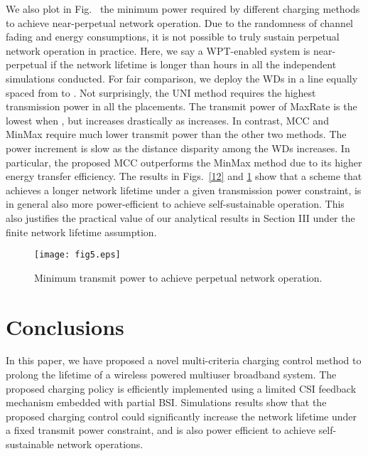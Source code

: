 \documentclass[conference]{IEEEtran}
\begin{document}
We also plot in Fig.~ the minimum power required by different charging methods to achieve near-perpetual network operation. Due to the randomness of channel fading and energy consumptions, it is not possible to truly sustain perpetual network operation in practice. Here, we say a WPT-enabled system is near-perpetual if the network lifetime is longer than  hours in all the  independent simulations conducted. For fair comparison, we deploy the  WDs in a line equally spaced from  to . Not surprisingly, the UNI method requires the highest transmission power in all the placements. The transmit power of MaxRate is the lowest when , but increases drastically as  increases. In contrast, MCC and MinMax require much lower transmit power than the other two methods. The power increment is slow as the distance disparity among the WDs increases. In particular, the proposed MCC outperforms the MinMax method due to its higher energy transfer efficiency. The results in Figs.~\ref{12} and \ref{15} show that a scheme that achieves a longer network lifetime under a given transmission power constraint, is in general also more power-efficient to achieve self-sustainable operation. This also justifies the practical value of our analytical results in Section III under the finite network lifetime assumption.


\begin{figure}
\centering
  \begin{center}
    \texttt{[image: fig5.eps]}
  \end{center}
  \caption{Minimum transmit power to achieve perpetual network operation.}
  \label{15}
\end{figure}

\section{Conclusions}
In this paper, we have proposed a novel multi-criteria charging control method to prolong the lifetime of a wireless powered multiuser broadband system. The proposed charging policy is efficiently implemented using a limited CSI feedback mechanism embedded with partial BSI. Simulations results show that the proposed charging control could significantly increase the network lifetime under a fixed transmit power constraint, and is also power efficient to achieve self-sustainable network operations.
\end{document}
